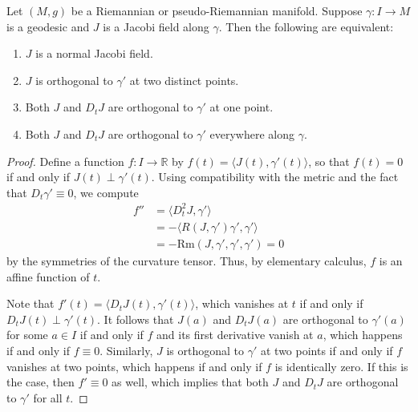\begin{proposition}
\label{prop:normal-jacobi-equivalent-conditions}

Let $(M, g)$ be a Riemannian or pseudo-Riemannian manifold. Suppose $\gamma: I \to M$ is a geodesic and $J$ is a Jacobi field along $\gamma$. Then the following are equivalent:

\begin{enumerate}
\item[(a)] $J$ is a normal Jacobi field.
\item[(b)] $J$ is orthogonal to $\gamma'$ at two distinct points.
\item[(c)] Both $J$ and $D_t J$ are orthogonal to $\gamma'$ at one point.
\item[(d)] Both $J$ and $D_t J$ are orthogonal to $\gamma'$ everywhere along $\gamma$.
\end{enumerate}

\begin{proof}
Define a function $f: I \to \mathbb{R}$ by $f(t) = \langle J(t), \gamma'(t) \rangle$, so that $f(t) = 0$ if and only if $J(t) \perp \gamma'(t)$. Using compatibility with the metric and the fact that $D_t \gamma' \equiv 0$, we compute
\begin{align*}
f'' &= \langle D_t^2 J, \gamma' \rangle \\
&= -\langle R(J, \gamma') \gamma', \gamma' \rangle \\
&= -\mathrm{Rm}(J, \gamma', \gamma', \gamma') = 0
\end{align*}
by the symmetries of the curvature tensor. Thus, by elementary calculus, $f$ is an affine function of $t$.

Note that $f'(t) = \langle D_t J(t), \gamma'(t) \rangle$, which vanishes at $t$ if and only if $D_t J(t) \perp \gamma'(t)$. It follows that $J(a)$ and $D_t J(a)$ are orthogonal to $\gamma'(a)$ for some $a \in I$ if and only if $f$ and its first derivative vanish at $a$, which happens if and only if $f \equiv 0$. Similarly, $J$ is orthogonal to $\gamma'$ at two points if and only if $f$ vanishes at two points, which happens if and only if $f$ is identically zero. If this is the case, then $f' \equiv 0$ as well, which implies that both $J$ and $D_t J$ are orthogonal to $\gamma'$ for all $t$.
\end{proof}
\end{proposition}

